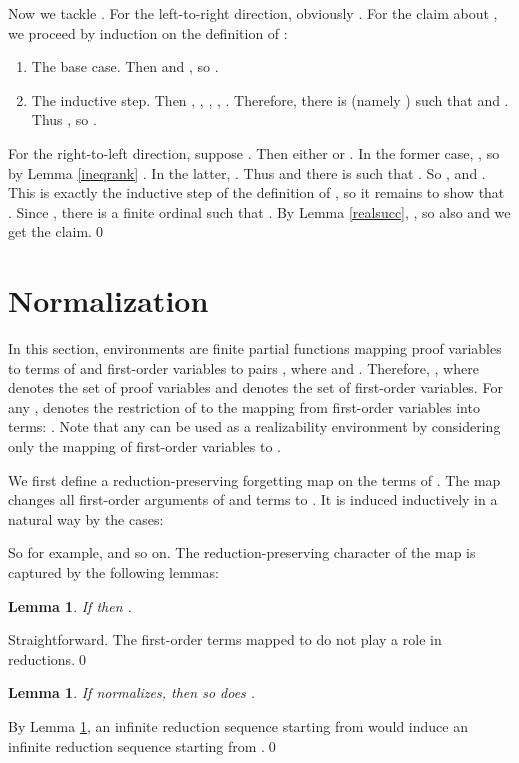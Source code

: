 \documentclass{LMCS}
\newtheorem{lemma}[thm]{Lemma}
\begin{document}
Now we tackle . For the left-to-right direction, obviously . For the claim about , we proceed by induction on the
definition of :
\begin{enumerate}[]
\item The base case. Then  and , so . 
\item The inductive step. Then , ,
, , .
Therefore, there is  (namely ) such that  and . Thus , so . 
\end{enumerate}
For the right-to-left direction, suppose . Then either  or . In the former case, , so by Lemma \ref{ineqrank} . In the latter, . Thus  and there is  such that . So ,  and . This is exactly the inductive step of the
definition of , so it remains to show that . Since , there is a finite ordinal
 such that . By Lemma \ref{realsucc}, , so also  and we get the claim.\qed


\section{Normalization}\label{sectionnorm}

In this section, environments  are finite partial functions mapping 
proof variables to terms of  and first-order variables to pairs , where  and . Therefore, , where  denotes the set of proof variables
and  denotes the set of first-order variables. For any ,
 denotes the restriction of  to the mapping from first-order
variables into terms: .  
Note that any  can be used as a realizability environment by considering
only the mapping of first-order variables to . 

We first define a reduction-preserving forgetting map  on the terms of
. The map changes all first-order arguments of  and
 terms to . It is induced inductively in a natural way by the cases:

So for example,  and so on. The reduction-preserving
character of the map is captured by the following lemmas:

\begin{lemma}\label{en1}
If  then . 
\end{lemma}
\proof Straightforward. The first-order terms mapped to  do not play a
role in reductions.\qed


\begin{lemma}\label{erasurenorm}
If  normalizes, then so does . 
\end{lemma}
\proof By Lemma \ref{en1}, an infinite reduction sequence starting from  would
induce an infinite reduction sequence starting from .\qed
\end{document}
